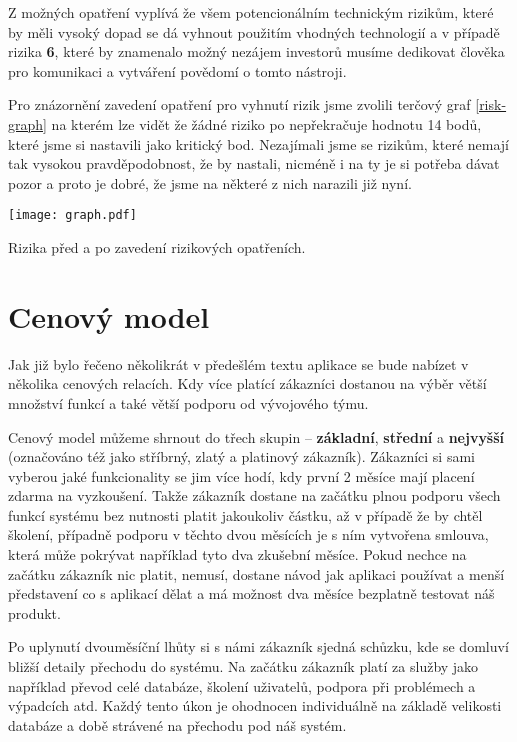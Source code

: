 \par Z možných opatření vyplívá že všem potencionálním technickým rizikům, které by měli vysoký dopad se dá vyhnout použitím vhodných technologií a v případě rizika \textbf{6}, které by znamenalo možný nezájem investorů musíme dedikovat člověka pro komunikaci a vytváření povědomí o tomto nástroji.

\par Pro znázornění zavedení opatření pro vyhnutí rizik jsme zvolili terčový graf \ref{risk-graph} na kterém lze vidět že žádné riziko po nepřekračuje hodnotu 14 bodů, které jsme si nastavili jako kritický bod. Nezajímali jsme se rizikům, které nemají tak vysokou pravděpodobnost, že by nastali, nicméně i na ty je si potřeba dávat pozor a proto je dobré, že jsme na některé z nich narazili již nyní.

\begin{graph}[ht]
\centering
\texttt{[image: graph.pdf]}
\caption{Rizika před a po zavedení rizikových opatřeních.}
\label{risk-graph}
\end{graph}

\section{Cenový model}
\par Jak již bylo řečeno několikrát v předešlém textu aplikace se bude nabízet v několika cenových relacích. Kdy více platící zákazníci dostanou na výběr větší množství funkcí a také větší podporu od vývojového týmu.

\par Cenový model můžeme shrnout do třech skupin -- \textbf{základní}, \textbf{střední} a \textbf{nejvyšší} (označováno též jako stříbrný, zlatý a platinový zákazník). Zákazníci si sami vyberou jaké funkcionality se jim více hodí, kdy první 2 měsíce mají placení zdarma na vyzkoušení. Takže zákazník dostane na začátku plnou podporu všech funkcí systému bez nutnosti platit jakoukoliv částku, až v případě že by chtěl školení, případně podporu v těchto dvou měsících je s ním vytvořena smlouva, která může pokrývat například tyto dva zkušební měsíce. Pokud nechce na začátku zákazník nic platit, nemusí, dostane návod jak aplikaci používat a menší představení co s aplikací dělat a má možnost dva měsíce bezplatně testovat náš produkt.

\par Po uplynutí dvouměsíční lhůty si s námi zákazník sjedná schůzku, kde se domluví bližší detaily přechodu do systému. Na začátku zákazník platí za služby jako například převod celé databáze, školení uživatelů, podpora při problémech a výpadcích atd. Každý tento úkon je ohodnocen individuálně na základě velikosti databáze a době strávené na přechodu pod náš systém.

